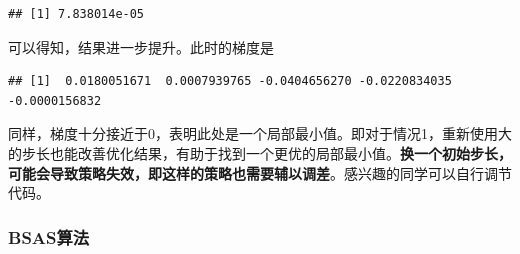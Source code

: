 \documentclass[]{ctexbook}
\newenvironment{Shaded}{\begin{snugshade}}{\end{snugshade}}
\newcommand{\KeywordTok}[1]{\textcolor[rgb]{0.13,0.29,0.53}{\textbf{#1}}}
\newcommand{\OperatorTok}[1]{\textcolor[rgb]{0.81,0.36,0.00}{\textbf{#1}}}
\newcommand{\NormalTok}[1]{#1}
\begin{document}
\begin{verbatim}
## [1] 7.838014e-05
\end{verbatim}

可以得知，结果进一步提升。此时的梯度是

\begin{Shaded}
\end{Shaded}

\begin{verbatim}
## [1]  0.0180051671  0.0007939765 -0.0404656270 -0.0220834035 -0.0000156832
\end{verbatim}

同样，梯度十分接近于0，表明此处是一个局部最小值。即对于情况1，重新使用大的步长也能改善优化结果，有助于找到一个更优的局部最小值。\textbf{换一个初始步长，可能会导致策略失效，即这样的策略也需要辅以调差}。感兴趣的同学可以自行调节代码。

\subsubsection{BSAS算法}\label{bsas-1}
\end{document}
